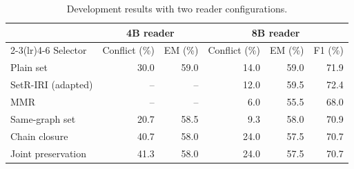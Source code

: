 \begin{table}[pos=H]
\caption{Development results with two reader configurations.}\label{tab:development}
\centering\small
\setlength{\tabcolsep}{6pt}
\begin{tabular}{lrrrrr}
\toprule
& \multicolumn{2}{c}{4B reader} & \multicolumn{3}{c}{8B reader} \\ \cmidrule(lr){2-3}\cmidrule(lr){4-6} Selector & Conflict (\%) & EM (\%) & Conflict (\%) & EM (\%) & F1 (\%) \\
\midrule
Plain set & 30.0 & 59.0 & 14.0 & 59.0 & 71.9 \\
SetR-IRI (adapted) & -- & -- & 12.0 & 59.5 & 72.4 \\
MMR & -- & -- & 6.0 & 55.5 & 68.0 \\
Same-graph set & 20.7 & 58.5 & 9.3 & 58.0 & 70.9 \\
Chain closure & 40.7 & 58.0 & 24.0 & 57.5 & 70.7 \\
Joint preservation & 41.3 & 58.0 & 24.0 & 57.5 & 70.7 \\
\bottomrule
\end{tabular}
\end{table}
